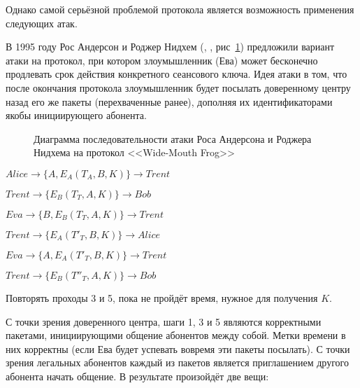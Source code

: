 Однако самой серьёзной проблемой протокола является возможность применения следующих атак.

В 1995 году Рос Андерсон и Роджер Нидхем (, \cite{Anderson:Needham:1995}, рис~\ref{fig:key_distribution-wide-mouth_frog-Anderson-Needham-attack}) предложили вариант атаки на протокол, при котором злоумышленник (Ева) может бесконечно продлевать срок действия конкретного сеансового ключа. Идея атаки в том, что после окончания протокола злоумышленник будет посылать доверенному центру назад его же пакеты (перехваченные ранее), дополняя их идентификаторами якобы инициирующего абонента.

\begin{figure}
	\centering
	\begin{sequencediagram}
		
	\end{sequencediagram}
	\caption{Диаграмма последовательности атаки Роса Андерсона и Роджера Нидхема на протокол <<Wide-Mouth Frog>>\label{fig:key_distribution-wide-mouth_frog-Anderson-Needham-attack}}
\end{figure}

\begin{protocol}
	\item[(1)] $Alice \to \{ A, E_A \left( T_A, B, K \right) \} \to Trent$
	\item[(2)] $Trent \to \{ E_B \left( T_T, A, K \right) \} \to Bob$
	\item[(3)] $Eva \to \{ B, E_B \left( T_T, A, K \right) \} \to Trent$
	\item[(4)] $Trent \to \{ E_A \left( T'_T, B, K \right) \} \to Alice$
	\item[(5)] $Eva \to \{ A, E_A \left( T'_T, B, K \right) \} \to Trent$
	\item[(6)] $Trent \to \{ E_B \left( T''_T, A, K \right) \} \to Bob$
	\item[{}] Повторять проходы 3 и 5, пока не пройдёт время, нужное для получения $K$.
\end{protocol}

С точки зрения доверенного центра, шаги 1, 3 и 5 являются корректными пакетами, инициирующими общение абонентов между собой. Метки времени в них корректны (если Ева будет успевать вовремя эти пакеты посылать). С точки зрения легальных абонентов каждый из пакетов является приглашением другого абонента начать общение. В результате произойдёт две вещи:

